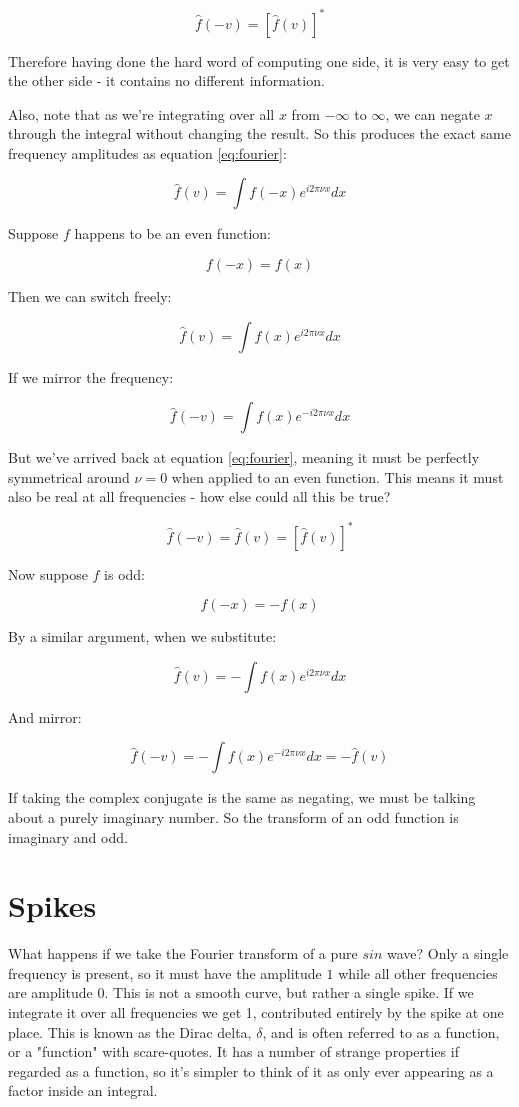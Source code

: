 $$
\hat{f}(-v) = \left[ \hat{f}(v) \right]^*
$$

Therefore having done the hard word of computing one side, it is very easy to get the other side - it contains no different information.

Also, note that as we're integrating over all $x$ from $-\infty$ to $\infty$, we can negate $x$ through the integral without changing the result. So this produces the exact same frequency amplitudes as equation \ref{eq:fourier}:

$$\hat{f}(v) = \int f(-x)e^{i2\pi\nu x} dx$$

Suppose $f$ happens to be an even function:

$$f(-x) = f(x)$$

Then we can switch freely:

$$\hat{f}(v) = \int f(x)e^{i2\pi\nu x} dx$$

If we mirror the frequency:

$$\hat{f}(-v) = \int f(x)e^{-i2\pi\nu x} dx$$

But we've arrived back at equation \ref{eq:fourier}, meaning it must be perfectly symmetrical around $\nu = 0$ when applied to an even function. This means it must also be real at all frequencies - how else could all this be true?

$$
\hat{f}(-v) = \hat{f}(v) = \left[ \hat{f}(v) \right]^*
$$

Now suppose $f$ is odd:

$$f(-x) = -f(x)$$

By a similar argument, when we substitute:

$$
\hat{f}(v) = - \int f(x)e^{i2\pi\nu x}
dx
$$

And mirror:

$$
\hat{f}(-v) = - \int f(x)e^{-i2\pi\nu x}
dx
= -\hat{f}(v)
$$

If taking the complex conjugate is the same as negating, we must be talking about a purely imaginary number. So the transform of an odd function is imaginary and odd.

\section{Spikes}

What happens if we take the Fourier transform of a pure $sin$ wave? Only a single frequency is present, so it must have the amplitude $1$ while all other frequencies are amplitude $0$. This is not a smooth curve, but rather a single spike. If we integrate it over all frequencies we get 1, contributed entirely by the spike at one place. This is known as the Dirac delta, $\delta$, and is often referred to as a function, or a "function" with scare-quotes. It has a number of strange properties if regarded as a function, so it's simpler to think of it as only ever appearing as a factor inside an integral.

